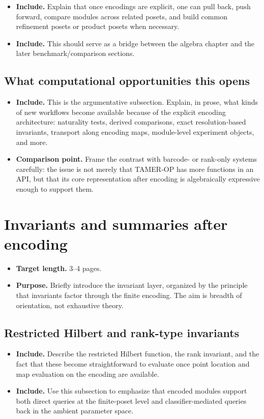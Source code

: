 \documentclass[11pt]{article}
\newcommand{\TAMER}{\textsc{TAMER-OP}}
\newenvironment{plan}{\begin{itemize}[leftmargin=1.6em,itemsep=0.35em,topsep=0.25em]}{\end{itemize}}
\newcommand{\target}[1]{\item \textbf{Target length.} #1}
\newcommand{\purpose}[1]{\item \textbf{Purpose.} #1}
\newcommand{\includeitems}[1]{\item \textbf{Include.} #1}
\newcommand{\compare}[1]{\item \textbf{Comparison point.} #1}
\begin{document}
\begin{plan}
    \includeitems{Explain that once encodings are explicit, one can pull back, push forward, compare modules across related posets, and build common refinement posets or product posets when necessary.}
    \includeitems{This should serve as a bridge between the algebra chapter and the later benchmark/comparison sections.}
\end{plan}

\subsection{What computational opportunities this opens}

\begin{plan}
    \includeitems{This is the argumentative subsection. Explain, in prose, what kinds of new workflows become available because of the explicit encoding architecture: naturality tests, derived comparisons, exact resolution-based invariants, transport along encoding maps, module-level experiment objects, and more.}
    \compare{Frame the contrast with barcode- or rank-only systems carefully: the issue is not merely that \TAMER{} has more functions in an API, but that its core representation after encoding is algebraically expressive enough to support them.}
\end{plan}

\section{Invariants and summaries after encoding}\label{sec:invariants}

\begin{plan}
    \target{3--4 pages.}
    \purpose{Briefly introduce the invariant layer, organized by the principle that invariants factor through the finite encoding. The aim is breadth of orientation, not exhaustive theory.}
\end{plan}

\subsection{Restricted Hilbert and rank-type invariants}

\begin{plan}
    \includeitems{Describe the restricted Hilbert function, the rank invariant, and the fact that these become straightforward to evaluate once point location and map evaluation on the encoding are available.}
    \includeitems{Use this subsection to emphasize that encoded modules support both direct queries at the finite-poset level and classifier-mediated queries back in the ambient parameter space.}
\end{plan}
\end{document}
